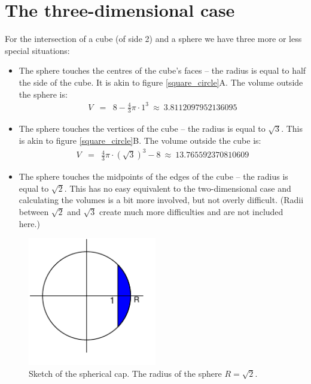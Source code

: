 \documentclass[onecolumn]{article}
\begin{document}
\section*{The three-dimensional case}
For the intersection of a cube (of side 2) and a sphere we have three more or less special situations:
\begin{itemize}
\item
The sphere touches the centres of the cube's faces -- the radius is equal to half the side of the cube.
It is akin to figure \ref{square_circle}A. The volume outside the sphere is:
\begin{eqnarray}
\nonumber    V &=& 8 - \frac{4}{3} \pi \cdot 1^3 ~\approx~ 3.8112097952136095
\end{eqnarray}

\item
The sphere touches the vertices of the cube -- the radius is equal to $\sqrt{3}$.
This is akin to figure \ref{square_circle}B. The volume outside the cube is:
\begin{eqnarray}
\nonumber    V &=& \frac{4}{3} \pi \cdot (\sqrt{3})^3 - 8 ~\approx~ 13.765592370810609
\end{eqnarray}
\item
The sphere touches the midpoints of the edges of the cube -- the radius is equal to $\sqrt{2}$.
This has no easy equivalent to the two-dimensional case and calculating the volumes is a bit more involved, but not
overly difficult. (Radii between $\sqrt{2}$ and $\sqrt{3}$ create much more difficulties and are not included here.)
\end{itemize}

\begin{figure}[H]
\caption{Sketch of the spherical cap. The radius of the sphere $R = \sqrt{2}$.}
\label{integral}
\begin{center}
\includegraphics[width=0.5\textwidth]{integral_chord.pdf}
\end{center}
\end{figure}
\end{document}
